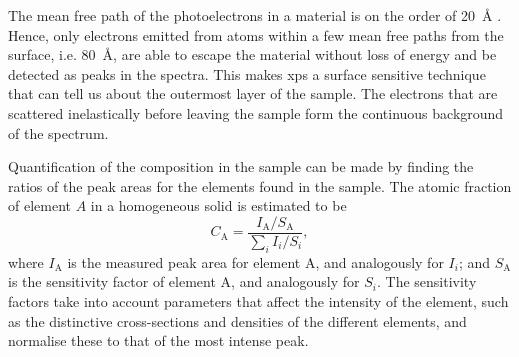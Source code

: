 The mean free path of the photoelectrons in a material is on the order of \SI{20}{\angstrom} \citep{}. Hence, only electrons emitted from atoms within a few mean free paths from the surface, i.e. \SI{80}{\angstrom}, are able to escape the material without loss of energy and be detected as peaks in the spectra. This makes \ac{xps} a surface sensitive technique that can tell us about the outermost layer of the sample. The electrons that are scattered inelastically before leaving the sample form the continuous background of the spectrum.

Quantification of the composition in the sample can be made by finding the ratios of the peak areas for the elements found in the sample. The atomic fraction of element $A$ in a homogeneous solid is estimated to be \citep{moulder2000handbook}
\begin{equation}\label{eq:xps_concentration}
    C_\mathrm{A} = \frac{I_\mathrm{A}/S_\mathrm{A}}{\sum_i I_i/S_i},
\end{equation}
where $I_\mathrm{A}$ is the measured peak area for element A, and analogously for $I_i$; and $S_\mathrm{A}$ is the sensitivity factor of element A, and analogously for $S_i$. The sensitivity factors take into account parameters that affect the intensity of the element, such as the distinctive cross-sections and densities of the different elements, and normalise these to that of the most intense peak. %

